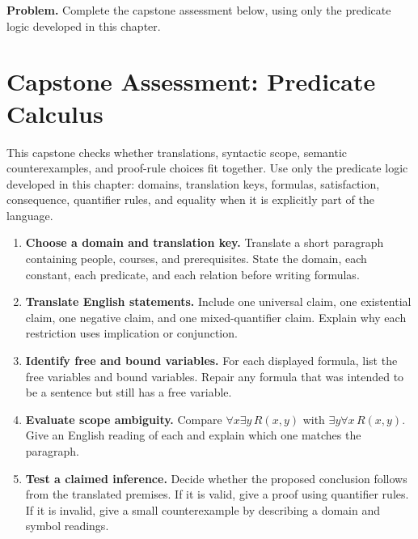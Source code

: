 \newpage
{}
\label{cap:predicate-logic}

\begin{tcolorbox}[
  colback=gray!6,
  colframe=gray!40,
  arc=2pt,
  left=8pt, right=8pt, top=6pt, bottom=6pt,
  title={\small\textbf{Capstone Problem}},
  fonttitle=\small\bfseries
]
\textbf{Problem.}
Complete the capstone assessment below, using only the predicate logic
developed in this chapter.
\end{tcolorbox}


\section{Capstone Assessment: Predicate Calculus}

\begin{remark*}
This capstone checks whether translations, syntactic scope, semantic
counterexamples, and proof-rule choices fit together. Use only the predicate
logic developed in this chapter: domains, translation keys, formulas,
satisfaction, consequence, quantifier rules, and equality when it is explicitly
part of the language.
\end{remark*}

\begin{enumerate}
  \item \textbf{Choose a domain and translation key.}
  Translate a short paragraph containing people, courses, and prerequisites.
  State the domain, each constant, each predicate, and each relation before
  writing formulas.

  \item \textbf{Translate English statements.}
  Include one universal claim, one existential claim, one negative claim, and
  one mixed-quantifier claim. Explain why each restriction uses implication or
  conjunction.

  \item \textbf{Identify free and bound variables.}
  For each displayed formula, list the free variables and bound variables.
  Repair any formula that was intended to be a sentence but still has a free
  variable.

  \item \textbf{Evaluate scope ambiguity.}
  Compare \(\forall x\exists y\,R(x,y)\) with
  \(\exists y\forall x\,R(x,y)\). Give an English reading of each and explain
  which one matches the paragraph.

  \item \textbf{Test a claimed inference.}
  Decide whether the proposed conclusion follows from the translated premises.
  If it is valid, give a proof using quantifier rules. If it is invalid, give a
  small counterexample by describing a domain and symbol readings.
\end{enumerate}

